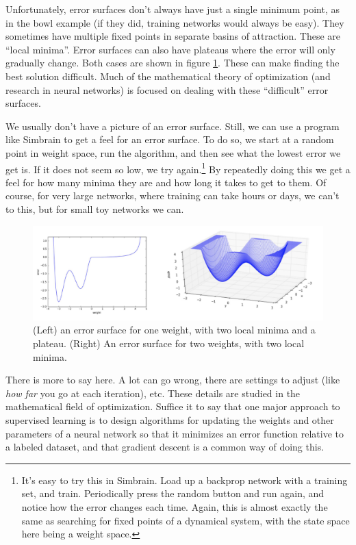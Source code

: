 Unfortunately, error surfaces don't always have just a single minimum point, as in the bowl example (if they did, training networks would always be easy). They sometimes have multiple fixed points in separate basins of attraction. These are ``local minima''. Error surfaces can also have plateaus where the error will only gradually change. Both cases are shown in figure \ref{local_minima}. These can make finding the best solution difficult. Much of the mathematical theory of optimization (and  research in neural networks) is focused on dealing with these ``difficult'' error surfaces.

We usually don't have a picture of an error surface. Still, we can use a program like Simbrain to get a feel for an error surface. To do so, we start at a random point in weight space, run the algorithm, and then see what the lowest error we get is. If it does not seem so low, we try again.\footnote{It's easy to try this in Simbrain. Load up a backprop network with a training set, and train. Periodically press the random button and run again, and notice how the error changes each time. Again, this is almost exactly the same as searching for fixed points of a dynamical system,  with the state space here being a weight space.} By repeatedly doing this we get a feel for how many minima they are and how long it takes to get to them. Of course, for very  large networks, where training can take hours or days, we can't to this, but for small toy networks we can.

\begin{figure}[h]
\centering
\includegraphics[scale=.4]{./images/LocalMinima1d2d.png}
\caption[Jeff Yoshimi and Scott Hotton.]{(Left) an error surface for one weight, with two local minima and a plateau. (Right) An error surface for two weights, with two local minima.}
\label{local_minima}
\end{figure}

 There is more to say here. A lot can go wrong, there are settings to adjust (like \emph{how far} you go at each iteration), etc. These details are studied in the mathematical field of optimization. Suffice it to say that one major approach to supervised learning is to design algorithms for updating the weights and other parameters of a neural network so that it minimizes an error function relative to a labeled dataset, and that gradient descent is a common way of doing this. 
 